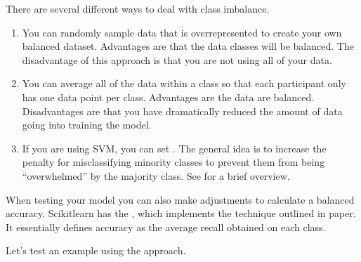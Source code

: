 \documentclass[letterpaper,10pt,english]{sphinxmanual}
\begin{document}
There are several different ways to deal with class imbalance.
\begin{enumerate}
%
\item {} 
 You can randomly sample data that is overrepresented to create your own balanced dataset. Advantages are that the data classes will be balanced. The disadvantage of this approach is that you are not using all of your data.

\item {} 
 You can average all of the data within a class so that each participant only has one data point per class. Advantages are the data are balanced. Disadvantages are that you have dramatically reduced the amount of data going into training the model.

\item {} 
 If you are using SVM, you can set . The general idea is to increase the penalty for misclassifying minority classes to prevent them from being “overwhelmed” by the majority class. See  for a brief overview.

\end{enumerate}

When testing your model you can also make adjustments to calculate a balanced accuracy. Scikit\sphinxhyphen{}learn has the , which implements the technique outlined in  paper. It essentially defines accuracy as the average recall obtained on each class.

Let’s test an example using the  approach.
\end{document}
